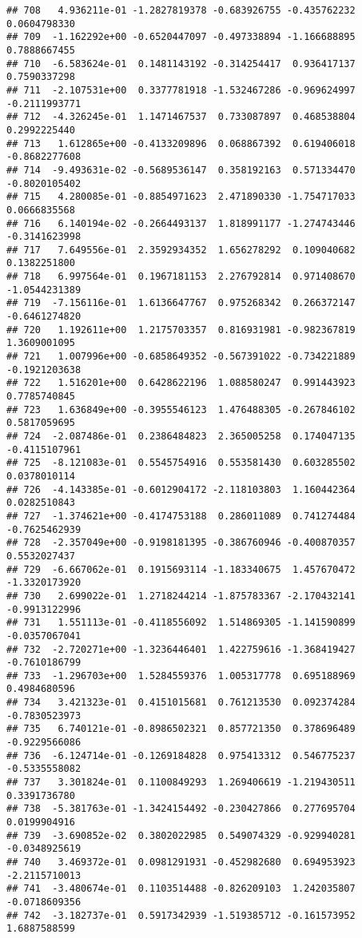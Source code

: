 \documentclass[
]{article}
\begin{document}
\begin{verbatim}
## 708   4.936211e-01 -1.2827819378 -0.683926755 -0.435762232  0.0604798330
## 709  -1.162292e+00 -0.6520447097 -0.497338894 -1.166688895  0.7888667455
## 710  -6.583624e-01  0.1481143192 -0.314254417  0.936417137  0.7590337298
## 711  -2.107531e+00  0.3377781918 -1.532467286 -0.969624997 -0.2111993771
## 712  -4.326245e-01  1.1471467537  0.733087897  0.468538804  0.2992225440
## 713   1.612865e+00 -0.4133209896  0.068867392  0.619406018 -0.8682277608
## 714  -9.493631e-02 -0.5689536147  0.358192163  0.571334470 -0.8020105402
## 715   4.280085e-01 -0.8854971623  2.471890330 -1.754717033  0.0666835568
## 716   6.140194e-02 -0.2664493137  1.818991177 -1.274743446 -0.3141623998
## 717   7.649556e-01  2.3592934352  1.656278292  0.109040682  0.1382251800
## 718   6.997564e-01  0.1967181153  2.276792814  0.971408670 -1.0544231389
## 719  -7.156116e-01  1.6136647767  0.975268342  0.266372147 -0.6461274820
## 720   1.192611e+00  1.2175703357  0.816931981 -0.982367819  1.3609001095
## 721   1.007996e+00 -0.6858649352 -0.567391022 -0.734221889 -0.1921203638
## 722   1.516201e+00  0.6428622196  1.088580247  0.991443923  0.7785740845
## 723   1.636849e+00 -0.3955546123  1.476488305 -0.267846102  0.5817059695
## 724  -2.087486e-01  0.2386484823  2.365005258  0.174047135 -0.4115107961
## 725  -8.121083e-01  0.5545754916  0.553581430  0.603285502  0.0378010114
## 726  -4.143385e-01 -0.6012904172 -2.118103803  1.160442364  0.0282510843
## 727  -1.374621e+00 -0.4174753188  0.286011089  0.741274484 -0.7625462939
## 728  -2.357049e+00 -0.9198181395 -0.386760946 -0.400870357  0.5532027437
## 729  -6.667062e-01  0.1915693114 -1.183340675  1.457670472 -1.3320173920
## 730   2.699022e-01  1.2718244214 -1.875783367 -2.170432141 -0.9913122996
## 731   1.551113e-01 -0.4118556092  1.514869305 -1.141590899 -0.0357067041
## 732  -2.720271e+00 -1.3236446401  1.422759616 -1.368419427 -0.7610186799
## 733  -1.296703e+00  1.5284559376  1.005317778  0.695188969  0.4984680596
## 734   3.421323e-01  0.4151015681  0.761213530  0.092374284 -0.7830523973
## 735   6.740121e-01 -0.8986502321  0.857721350  0.378696489 -0.9229566086
## 736  -6.124714e-01 -0.1269184828  0.975413312  0.546775237 -0.5335558082
## 737   3.301824e-01  0.1100849293  1.269406619 -1.219430511  0.3391736780
## 738  -5.381763e-01 -1.3424154492 -0.230427866  0.277695704  0.0199904916
## 739  -3.690852e-02  0.3802022985  0.549074329 -0.929940281 -0.0348925619
## 740   3.469372e-01  0.0981291931 -0.452982680  0.694953923 -2.2115710013
## 741  -3.480674e-01  0.1103514488 -0.826209103  1.242035807 -0.0718609356
## 742  -3.182737e-01  0.5917342939 -1.519385712 -0.161573952  1.6887588599

\end{verbatim}
\end{document}
